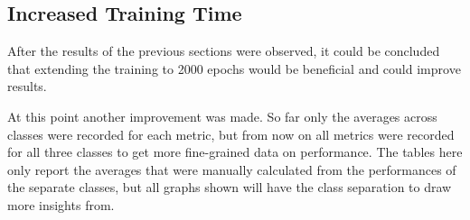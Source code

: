 \documentclass[bsc,frontabs,singlespacing,parskip,deptreport]{infthesis}
\begin{document}
\begin{table}
\begin{center}
\caption{AUC metric performance of all model types in the first experiment, averaged over 10 runs. The Transformer model was only run 4 times and with 2 encoder layers}
\end{center}
\vskip -3mm
\end{table}

\subsection{Increased Training Time}

After the results of the previous sections were observed, it could be concluded that extending the training to 2000 epochs would be beneficial and could improve results. 

At this point another improvement was made. So far only the averages across classes were recorded for each metric, but from now on all metrics were recorded for all three classes to get more fine-grained data on performance. The tables here only report the averages that were manually calculated from the performances of the separate classes, but all graphs shown will have the class separation to draw more insights from.
\end{document}
